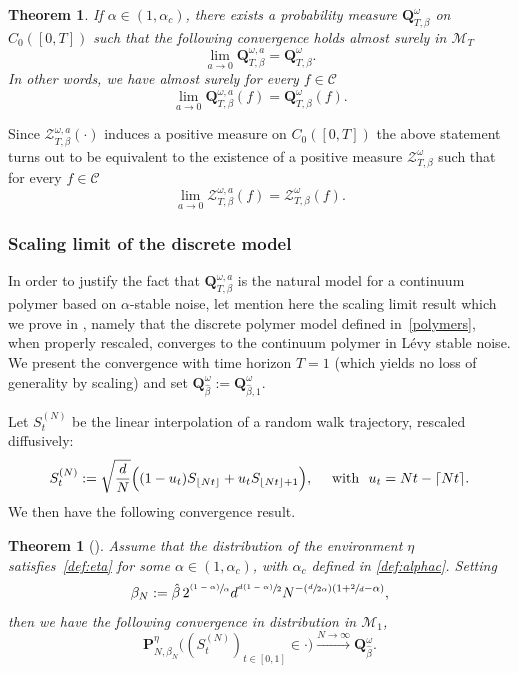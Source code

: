 \documentclass[JEP,XML,SOM,Unicode,published]{cedram}
\let\mathcal\mathscr
\newcommand{\Psfrac}[2]{(\sfrac{#1}{#2})}
\newcommand{\psfrac}[2]{\sfrac{(#1)}{#2}}
\newtheorem{theorema}{Theorem}
\newtheorem{theorem}{Theorem}[section]
\theoremstyle{definition}
\newcommand{\cC}{{\ensuremath{\mathcal C}} }
\newcommand{\cM}{{\ensuremath{\mathcal M}} }
\newcommand{\cZ}{{\ensuremath{\mathcal Z}} }
\newcommand{\bP}{{\ensuremath{\mathbf P}} }
\newcommand{\bQ}{{\ensuremath{\mathbf Q}} }
\let\ga\alpha
\let\go\omega
\begin{document}
\begin{theorem}\label{thm:contmeasure}
If $\ga\in (1,\ga_c)$, there exists a probability measure
$\bQ^{\go}_{T,\beta}$ on $C_0([0,T])$ such that
the following convergence holds almost surely in $\cM_T$
\[
\lim_{a\to 0} \bQ^{\go,a}_{T,\beta}= \bQ^{\go}_{T,\beta}.
\]
In other words, we have almost surely for every $f\in \cC$
\begin{equation}
\lim_{a\to 0} \bQ^{\go,a}_{T,\beta}(f)= \bQ^{\go}_{T,\beta}(f).
\end{equation}
\end{theorem}
Since
$\cZ^{\go,a }_{T, \beta}(\cdot)$ induces a positive measure on $C_0([0,T])$ the above statement turns out to be equivalent to the existence of a positive measure $\cZ^{\go}_{T, \beta}$ such that for every $f\in \cC$
\begin{equation}
\lim_{a \to 0}\cZ^{\go,a }_{T, \beta}(f)=\cZ^{\go}_{T, \beta}(f).
\end{equation}

\subsubsection{Scaling limit of the discrete model}

In order to justify the fact that $\bQ^{\go,a}_{T,\beta}$ is the natural model for a continuum polymer based on $\alpha$-stable noise, let mention here the scaling limit result which we prove in \cite{BL20_disc},
namely that the discrete polymer model defined in~\eqref{polymers},
when properly rescaled, converges to the continuum
polymer in Lévy stable noise.
We present the convergence with time horizon $T=1$ (which yields no loss of generality by scaling) and set $\bQ^{\go }_{ \hat \beta}:= \bQ^{\go }_{ \hat \beta,1}$.

Let $S_t^{(N)}$ be the linear interpolation
of a random walk trajectory, rescaled diffusively:\vspace*{-3pt}\enlargethispage{\baselineskip}%
\begin{equation}\label{defsn}
S^{(N)}_t:= \sqrt{\frac{d}{N}} \Bigl((1-u_t) S_{\lfloor Nt \rfloor} +u_t S_{\lfloor Nt \rfloor+1} \Bigr),
\quad \text{ with } \ u_t= Nt-\lceil N t \rceil.
\end{equation}
We then have the following convergence result.

\begin{theorema}[\cf \cite{BL20_disc}]
\label{thm:conv}
Assume that the distribution of the environment $\eta$ satisfies~\eqref{def:eta} for some $\alpha\in (1,\alpha_c)$, with $\alpha_c$ defined in \eqref{def:alphac}.
Setting
\begin{equation}\label{scalechoice}
\beta_N:= \hat \beta\, 2^{\psfrac{1-\ga}{\alpha}} d^{\sfrac{d(1-\alpha)}{2}} N^{- \Psfrac{d}{2\ga} (1+ \sfrac{2}{d}-\alpha) },
\end{equation}
then we have the following convergence in distribution in $\cM_1$,
\begin{equation}
\bP^{\eta}_{N,\beta_N}\bigl((S^{(N)}_t)_{t\in [0,1]} \in \cdot \bigr) \stackrel{N\to \infty}\to \bQ^{\go }_{ \hat \beta}.
\end{equation}
\end{theorema}
\end{document}
